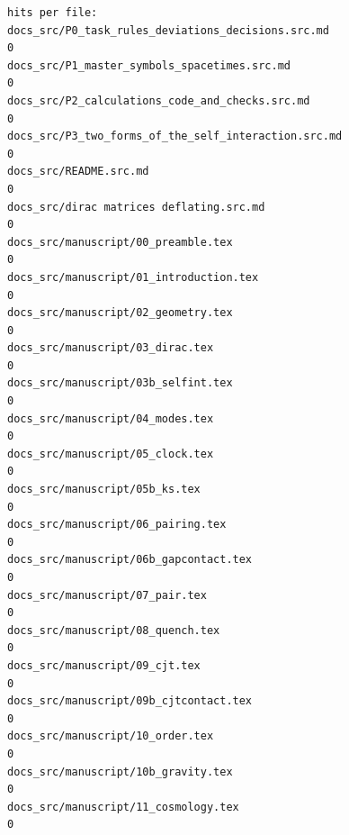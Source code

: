 \documentclass[
  10pt,
]{article}
\begin{document}
\begin{verbatim}
hits per file:
docs_src/P0_task_rules_deviations_decisions.src.md                                                             0
docs_src/P1_master_symbols_spacetimes.src.md                                                                   0
docs_src/P2_calculations_code_and_checks.src.md                                                                0
docs_src/P3_two_forms_of_the_self_interaction.src.md                                                           0
docs_src/README.src.md                                                                                         0
docs_src/dirac matrices deflating.src.md                                                                       0
docs_src/manuscript/00_preamble.tex                                                                            0
docs_src/manuscript/01_introduction.tex                                                                        0
docs_src/manuscript/02_geometry.tex                                                                            0
docs_src/manuscript/03_dirac.tex                                                                               0
docs_src/manuscript/03b_selfint.tex                                                                            0
docs_src/manuscript/04_modes.tex                                                                               0
docs_src/manuscript/05_clock.tex                                                                               0
docs_src/manuscript/05b_ks.tex                                                                                 0
docs_src/manuscript/06_pairing.tex                                                                             0
docs_src/manuscript/06b_gapcontact.tex                                                                         0
docs_src/manuscript/07_pair.tex                                                                                0
docs_src/manuscript/08_quench.tex                                                                              0
docs_src/manuscript/09_cjt.tex                                                                                 0
docs_src/manuscript/09b_cjtcontact.tex                                                                         0
docs_src/manuscript/10_order.tex                                                                               0
docs_src/manuscript/10b_gravity.tex                                                                            0
docs_src/manuscript/11_cosmology.tex                                                                           0

\end{verbatim}
\end{document}

